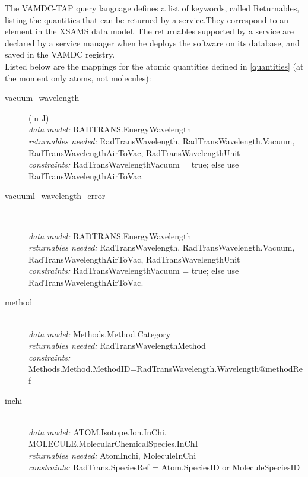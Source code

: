 \documentclass[11pt,a4paper]{ivoa}
\begin{document}
The VAMDC-TAP query language defines a list of keywords, called
\href{https://standards.vamdc.eu/dictionary/returnables.html}{Returnables},
listing the quantities that can be returned by a service.They correspond
to an element in the XSAMS data model.  The returnables supported by a
service are declared by a service manager when he deploys the software
on its database, and saved in the VAMDC registry. \\

Listed below are the mappings for the atomic quantities defined in
\ref{quantities} (at the moment only atoms, not molecules):

\renewcommand{\descriptionlabel}[1]{\hspace{\labelsep}\texttt{#1}}
\begin{description}

\item [vacuum\_wavelength] (in J)\hfill\\
    \textit{data model:} RADTRANS.EnergyWavelength\\
	\textit{returnables needed:} RadTransWavelength, RadTransWavelength.Vacuum, 
RadTransWavelengthAirToVac, RadTransWavelengthUnit\\
	\textit{constraints:} RadTransWavelengthVacuum = true; else use 
RadTransWavelengthAirToVac. \\
	
\item [vacuuml\_wavelength\_error]  \hfill\\

    \textit{data model:} RADTRANS.EnergyWavelength\\
	\textit{returnables needed:} RadTransWavelength, RadTransWavelength.Vacuum, 
RadTransWavelengthAirToVac, RadTransWavelengthUnit\\
	\textit{constraints:} RadTransWavelengthVacuum = true; else use 
RadTransWavelengthAirToVac.\\
	
\item [method] \hfill\\
	\textit{data model:} Methods.Method.Category\\
	\textit{returnables needed:} RadTransWavelengthMethod\\
	\textit{constraints:} 
Methods.Method.MethodID=RadTransWavelength.Wavelength@methodRef\\

\item [inchi] \hfill\\
	\textit{data model:} ATOM.Isotope.Ion.InChi,  
MOLECULE.MolecularChemicalSpecies.InChI\\
        \textit{returnables needed:} AtomInchi, MoleculeInChi\\
	\textit{constraints:} RadTrans.SpeciesRef = Atom.SpeciesID or MoleculeSpeciesID
	

\end{description}
\end{document}

